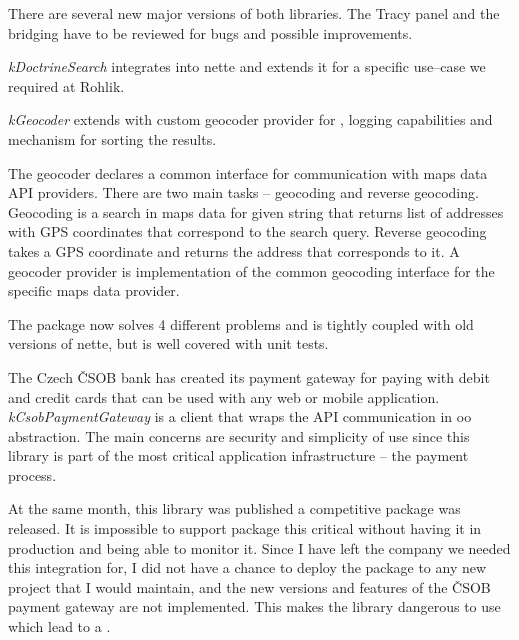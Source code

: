 There are several new major versions of both libraries. The Tracy panel and the bridging have to be reviewed for bugs and possible improvements.

 \label{sec:state:doctrine-search}

\textit{\gls{kDoctrineSearch}} integrates  into \gls{nette} and extends it for a specific use--case we required at Rohlik.

 \label{sec:state:geocoder}

\textit{\gls{kGeocoder}} extends  with custom geo\-co\-de\-r provider for , logging capabilities and mechanism for sorting the results.

The geo\-co\-de\-r declares a common interface for communication with maps data API providers. There are two main tasks -- geocoding and reverse geocoding. Geocoding is a search in maps data for given string that returns list of addresses with GPS coordinates that correspond to the search query. Reverse geocoding takes a GPS coordinate and returns the address that corresponds to it. A geo\-co\-de\-r provider is implementation of the common geocoding interface for the specific maps data provider.

The package now solves 4 different problems and is tightly coupled with old versions of \gls{nette}, but is well covered with unit tests.

 \label{sec:state:csob-payment-gateway}

The Czech ČSOB bank has created its payment gateway for paying with debit and credit cards that can be used with any web or mobile application. \textit{\gls{kCsobPaymentGateway}} is a client that wraps the API communication in \gls{oo} abstraction. The main concerns are security and simplicity of use since this library is part of the most critical application infrastructure -- the payment process.

At the same month, this library was published a competitive package  was released. It is impossible to support package this critical without having it in production and being able to monitor it. Since I have left the company we needed this integration for, I did not have a chance to deploy the package to any new project that I would maintain, and the new versions and features of the ČSOB payment gateway are not implemented. This makes the library dangerous to use which lead to a .

